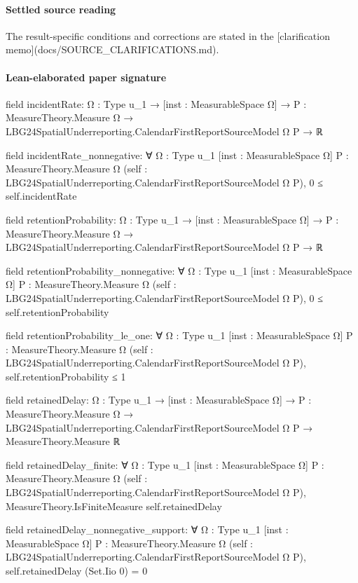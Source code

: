 \documentclass[10pt]{article}
\begin{document}
\paragraph{Settled source reading}
\begin{sloppypar}
The result-\allowbreak{}specific conditions and corrections are stated in the [clarification memo](docs/\allowbreak{}SOURCE\_\allowbreak{}CLARIFICATIONS.\allowbreak{}md).\allowbreak{}
\end{sloppypar}

\paragraph{Lean-elaborated paper signature}
\begin{ReviewVerbatim}
field incidentRate:
{Ω : Type u_1} →
  [inst : MeasurableSpace Ω] →
    {P : MeasureTheory.Measure Ω} → LBG24SpatialUnderreporting.CalendarFirstReportSourceModel Ω P → ℝ

field incidentRate_nonnegative:
∀ {Ω : Type u_1} [inst : MeasurableSpace Ω] {P : MeasureTheory.Measure Ω}
  (self : LBG24SpatialUnderreporting.CalendarFirstReportSourceModel Ω P), 0 ≤ self.incidentRate

field retentionProbability:
{Ω : Type u_1} →
  [inst : MeasurableSpace Ω] →
    {P : MeasureTheory.Measure Ω} → LBG24SpatialUnderreporting.CalendarFirstReportSourceModel Ω P → ℝ

field retentionProbability_nonnegative:
∀ {Ω : Type u_1} [inst : MeasurableSpace Ω] {P : MeasureTheory.Measure Ω}
  (self : LBG24SpatialUnderreporting.CalendarFirstReportSourceModel Ω P), 0 ≤ self.retentionProbability

field retentionProbability_le_one:
∀ {Ω : Type u_1} [inst : MeasurableSpace Ω] {P : MeasureTheory.Measure Ω}
  (self : LBG24SpatialUnderreporting.CalendarFirstReportSourceModel Ω P), self.retentionProbability ≤ 1

field retainedDelay:
{Ω : Type u_1} →
  [inst : MeasurableSpace Ω] →
    {P : MeasureTheory.Measure Ω} →
      LBG24SpatialUnderreporting.CalendarFirstReportSourceModel Ω P → MeasureTheory.Measure ℝ

field retainedDelay_finite:
∀ {Ω : Type u_1} [inst : MeasurableSpace Ω] {P : MeasureTheory.Measure Ω}
  (self : LBG24SpatialUnderreporting.CalendarFirstReportSourceModel Ω P),
  MeasureTheory.IsFiniteMeasure self.retainedDelay

field retainedDelay_nonnegative_support:
∀ {Ω : Type u_1} [inst : MeasurableSpace Ω] {P : MeasureTheory.Measure Ω}
  (self : LBG24SpatialUnderreporting.CalendarFirstReportSourceModel Ω P), self.retainedDelay (Set.Iio 0) = 0


\end{ReviewVerbatim}
\end{document}

